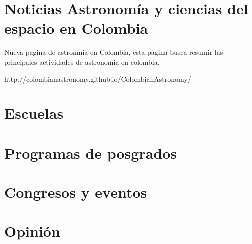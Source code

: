 \documentclass{book}
\begin{document}
\newcommand{\theimage}{fig22.jpg}
 
\tableofcontents{}

\section*{Noticias Astronomía y ciencias del espacio en Colombia}
 
 Nueva pagina de astronmia en Colombia, esta pagina
 busca resumir las principales actividades de astronomia 
 en colombia. 
 
 http://colombianastronomy.github.io/ColombianAstronomy/



       \section*{Escuelas}




       \section*{Programas de posgrados}




\section*{Congresos y eventos}



\section*{Opinión}






\end{document}
